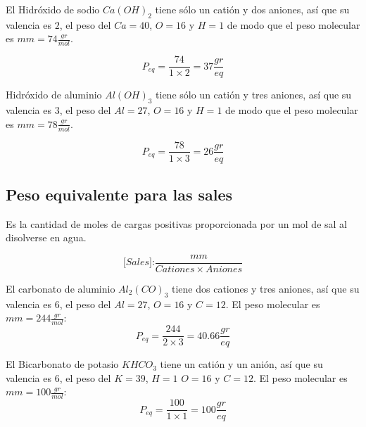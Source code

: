 \begin{example}
	El Hidróxido de sodio $Ca(OH)_{2}$ tiene sólo un catión y dos aniones, así que su valencia es $2$,
	el peso del $Ca=40$, $O=16$ y $H=1$ de modo que el peso molecular es $mm=74\frac{gr}{mol}$.

	\begin{equation*}
		P_{eq}= \frac{74}{1\times 2}= 37\frac{gr}{eq}
	\end{equation*}
\end{example}

\begin{example}
	Hidróxido de aluminio $Al(OH)_3$ tiene sólo un catión y tres aniones, así que su valencia es $3$,
	el peso del $Al=27$, $O=16$ y $H=1$ de modo que el peso molecular es $mm=78\frac{gr}{mol}$.

	\begin{equation*}
		P_{eq}= \frac{78}{1\times 3}= 26\frac{gr}{eq}
	\end{equation*}
\end{example}

\subsection{Peso equivalente para las sales}
Es la cantidad de moles de cargas positivas proporcionada por un mol de
sal al disolverse en agua.

\begin{equation}
	\textit{[Sales]:} \frac{mm}{Cationes\times Aniones}
\end{equation}

\begin{example}
	El carbonato de aluminio $Al_{2}(CO)_{3}$ tiene dos cationes y tres aniones, así que su valencia es $6$,
	el peso del $Al=27$, $O=16$ y $C=12$. El peso molecular es $mm=244\frac{gr}{mol}$:
	\begin{equation*}
		P_{eq}= \frac{244}{2\times 3}= 40.66\frac{gr}{eq}
	\end{equation*}
\end{example}

\begin{example}
	El Bicarbonato de potasio $KHCO_{3}$ tiene un catión y un anión, así que su valencia es $6$,
	el peso del $K=39$, $H=1$ $O=16$ y $C=12$. El peso molecular es $mm=100\frac{gr}{mol}$:
	\begin{equation*}
		P_{eq}= \frac{100}{1\times 1}= 100\frac{gr}{eq}
	\end{equation*}
\end{example}

